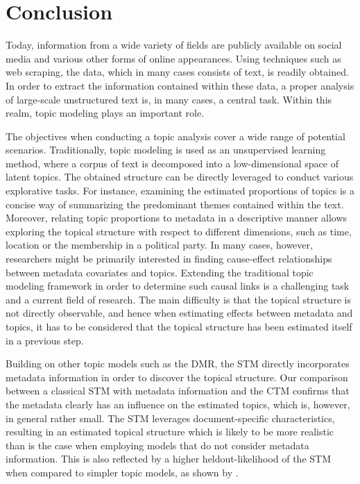 \section{Conclusion}
\label{Conclusion}

Today, information from a wide variety of fields are publicly available on social media and various other forms of online appearances. Using techniques such as web scraping, the data, which in many cases consists of text, is readily obtained. In order to extract the information contained within these data, a proper analysis of large-scale unstructured text is, in many cases, a central task. Within this realm, topic modeling plays an important role.

The objectives when conducting a topic analysis cover a wide range of potential scenarios. Traditionally, topic modeling is used as an unsupervised learning method, where a corpus of text is decomposed into a low-dimensional space of latent topics. The obtained structure can be directly leveraged to conduct various explorative tasks. For instance, examining the estimated proportions of topics is a concise way of summarizing the predominant themes contained within the text. Moreover, relating topic proportions to metadata in a descriptive manner allows exploring the topical structure with respect to different dimensions, such as time, location or the membership in a political party. In many cases, however, researchers might be primarily interested in finding cause-effect relationships between metadata covariates and topics. Extending the traditional topic modeling framework in order to determine such causal links is a challenging task and a current field of research. The main difficulty is that the topical structure is not directly observable, and hence when estimating effects between metadata and topics, it has to be considered that the topical structure has been estimated itself in a previous step.

Building on other topic models such as the DMR, the STM directly incorporates metadata information in order to discover the topical structure. Our comparison between a classical STM with metadata information and the CTM confirms that the metadata clearly has an influence on the estimated topics, which is, however, in general rather small. The STM leverages document-specific characteristics, resulting in an estimated topical structure which is likely to be more realistic than is the case when employing models that do not consider metadata information. This is also reflected by a higher heldout-likelihood of the STM when compared to simpler topic models, as shown by \cite{roberts2016model}.

